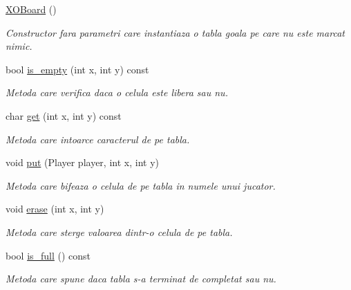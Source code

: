 \begin{DoxyCompactItemize}
\item 
\hypertarget{classXOBoard_a5740df9f6637e64adb7745228820b608}{
\hyperlink{classXOBoard_a5740df9f6637e64adb7745228820b608}{XOBoard} ()}
\label{classXOBoard_a5740df9f6637e64adb7745228820b608}

\begin{DoxyCompactList}\small\item\em Constructor fara parametri care instantiaza o tabla goala pe care nu este marcat nimic. \item\end{DoxyCompactList}\item 
bool \hyperlink{classXOBoard_afc284df051b707b824bc8289e5bffd22}{is\_\-empty} (int x, int y) const 
\begin{DoxyCompactList}\small\item\em Metoda care verifica daca o celula este libera sau nu. \item\end{DoxyCompactList}\item 
char \hyperlink{classXOBoard_a850b7cbdb93c080eb7db8d749bf1aafa}{get} (int x, int y) const 
\begin{DoxyCompactList}\small\item\em Metoda care intoarce caracterul de pe tabla. \item\end{DoxyCompactList}\item 
void \hyperlink{classXOBoard_a3190b1cd4b6d1665bb0b6c35411d0c3e}{put} (Player player, int x, int y)
\begin{DoxyCompactList}\small\item\em Metoda care bifeaza o celula de pe tabla in numele unui jucator. \item\end{DoxyCompactList}\item 
void \hyperlink{classXOBoard_a6e72af673a48b7a4de79d7b738a690c1}{erase} (int x, int y)
\begin{DoxyCompactList}\small\item\em Metoda care sterge valoarea dintr-\/o celula de pe tabla. \item\end{DoxyCompactList}\item 
bool \hyperlink{classXOBoard_a58b290b18786b246c9051958819b1d4f}{is\_\-full} () const 
\begin{DoxyCompactList}\small\item\em Metoda care spune daca tabla s-\/a terminat de completat sau nu. \item\end{DoxyCompactList}\item 

\end{DoxyCompactItemize}
